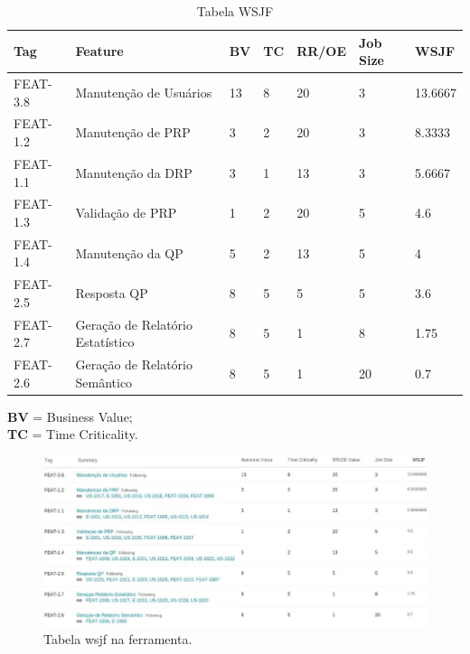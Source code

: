 	\begin{table}[htbp]
		\caption{Tabela WSJF}
		\begin{tabular}{|l|l|l|l|l|l|l|}
			\hline
			\textbf{Tag} & \textbf{Feature} & \textbf{BV} & \textbf{TC} & \textbf{RR/OE} & \textbf{Job Size} & \textbf{WSJF} \\ \hline

			FEAT-3.8 & Manutenção de Usuários & 13 & 8 & 20 & 3 & 13.6667\\ \hline

			FEAT-1.2 & Manutenção de PRP & 3 & 2 & 20 & 3 & 8.3333 \\ \hline

			FEAT-1.1 & Manutenção da DRP & 3 & 1 & 13 & 3 & 5.6667 \\ \hline

			FEAT-1.3 & Validação de PRP & 1 & 2 & 20 & 5 & 4.6 \\ \hline

			FEAT-1.4 & Manutenção da QP & 5 & 2 & 13 & 5 & 4 \\ \hline

			FEAT-2.5 & Resposta QP & 8 & 5 & 5 & 5 & 3.6 \\ \hline

			FEAT-2.7 & Geração de Relatório Estatístico & 8 & 5 & 1 & 8 & 1.75 \\ \hline

			FEAT-2.6 & Geração de Relatório Semântico & 8 & 5 & 1 & 20 & 0.7 \\ \hline
		\end{tabular}
	\label{Tabela WSJF}
	\end{table}
	\noindent
	\textbf{BV} = Business Value;\\
	\textbf{TC} = Time Criticality.\\

	\begin{landscape}
	\begin{figure}[h]
		\vspace*{1.05cm}
		\centering
		\includegraphics{imagens/wsjf3.jpg}
		\caption{Tabela wsjf na ferramenta.}
		\label{imagem}
	\end{figure}
	\end{landscape}


